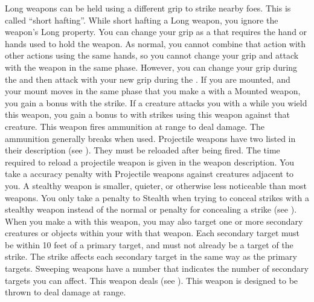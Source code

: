         Long weapons can be held using a different grip to strike nearby foes.
        This is called ``short hafting''.
        While short hafting a Long weapon, you ignore the weapon's Long property.
        You can change your grip as a  that requires the hand or hands used to hold the weapon.
        As normal, you cannot combine that action with other actions using the same hands, so you cannot change your grip and attack with the weapon in the same phase.
        However, you can change your grip during the  and then attack with your new grip during the .
        \label{Mounted Weapon} If you are mounted, and your mount moves in the same phase that you make a  with a Mounted weapon, you gain a   bonus with the strike.
         If a creature attacks you with a  while you wield this weapon, you  gain a  bonus to  with strikes using this weapon against that creature.
         This weapon fires ammunition at range to deal damage.
        The ammunition generally breaks when used.
        Projectile weapons have two  listed in their description (see ).
        They must be reloaded after being fired.
        The time required to reload a projectile weapon is given in the weapon description.
        You take a  accuracy penalty with Projectile weapons against creatures adjacent to you.
        A stealthy weapon is smaller, quieter, or otherwise less noticeable than most weapons.
        You only take a  penalty to Stealth when trying to conceal strikes with a stealthy weapon instead of the normal  or  penalty for concealing a strike (see ).
        \label{Sweeping} When you make a   with this weapon, you may also target one or more secondary creatures or objects within your  with that weapon.
        Each secondary target must be within 10 feet of a primary target, and must not already be a target of the strike.
        The strike affects each secondary target in the same way as the primary targets.
        Sweeping weapons have a number that indicates the number of secondary targets you can affect.
         This weapon deals  (see ).
         This weapon is designed to be thrown to deal damage at range.
